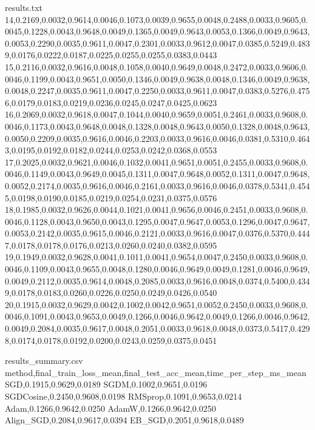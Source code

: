 \begin{filecontents*}{results.txt}
14,0.2169,0.0032,0.9614,0.0046,0.1073,0.0039,0.9655,0.0048,0.2488,0.0033,0.9605,0.0045,0.1228,0.0043,0.9648,0.0049,0.1365,0.0049,0.9643,0.0053,0.1366,0.0049,0.9643,0.0053,0.2290,0.0035,0.9611,0.0047,0.2301,0.0033,0.9612,0.0047,0.0385,0.5249,0.4839,0.0176,0.0222,0.0187,0.0225,0.0255,0.0255,0.0383,0.0443
15,0.2116,0.0032,0.9616,0.0048,0.1058,0.0040,0.9649,0.0048,0.2472,0.0033,0.9606,0.0046,0.1199,0.0043,0.9651,0.0050,0.1346,0.0049,0.9638,0.0048,0.1346,0.0049,0.9638,0.0048,0.2247,0.0035,0.9611,0.0047,0.2250,0.0033,0.9611,0.0047,0.0383,0.5276,0.4756,0.0179,0.0183,0.0219,0.0236,0.0245,0.0247,0.0425,0.0623
16,0.2069,0.0032,0.9618,0.0047,0.1044,0.0040,0.9659,0.0051,0.2461,0.0033,0.9608,0.0046,0.1173,0.0043,0.9648,0.0048,0.1328,0.0048,0.9643,0.0050,0.1328,0.0048,0.9643,0.0050,0.2209,0.0035,0.9616,0.0046,0.2203,0.0033,0.9616,0.0046,0.0381,0.5310,0.4643,0.0195,0.0192,0.0182,0.0244,0.0253,0.0242,0.0368,0.0553
17,0.2025,0.0032,0.9621,0.0046,0.1032,0.0041,0.9651,0.0051,0.2455,0.0033,0.9608,0.0046,0.1149,0.0043,0.9649,0.0045,0.1311,0.0047,0.9648,0.0052,0.1311,0.0047,0.9648,0.0052,0.2174,0.0035,0.9616,0.0046,0.2161,0.0033,0.9616,0.0046,0.0378,0.5341,0.4545,0.0198,0.0190,0.0185,0.0219,0.0254,0.0231,0.0375,0.0576
18,0.1985,0.0032,0.9626,0.0044,0.1021,0.0041,0.9656,0.0046,0.2451,0.0033,0.9608,0.0046,0.1128,0.0043,0.9650,0.0043,0.1295,0.0047,0.9647,0.0053,0.1296,0.0047,0.9647,0.0053,0.2142,0.0035,0.9615,0.0046,0.2121,0.0033,0.9616,0.0047,0.0376,0.5370,0.4447,0.0178,0.0178,0.0176,0.0213,0.0260,0.0240,0.0382,0.0595
19,0.1949,0.0032,0.9628,0.0041,0.1011,0.0041,0.9654,0.0047,0.2450,0.0033,0.9608,0.0046,0.1109,0.0043,0.9655,0.0048,0.1280,0.0046,0.9649,0.0049,0.1281,0.0046,0.9649,0.0049,0.2112,0.0035,0.9614,0.0048,0.2085,0.0033,0.9616,0.0048,0.0374,0.5400,0.4349,0.0178,0.0183,0.0260,0.0226,0.0250,0.0249,0.0426,0.0540
20,0.1915,0.0032,0.9629,0.0042,0.1002,0.0042,0.9651,0.0052,0.2450,0.0033,0.9608,0.0046,0.1091,0.0043,0.9653,0.0049,0.1266,0.0046,0.9642,0.0049,0.1266,0.0046,0.9642,0.0049,0.2084,0.0035,0.9617,0.0048,0.2051,0.0033,0.9618,0.0048,0.0373,0.5417,0.4298,0.0174,0.0178,0.0192,0.0200,0.0243,0.0259,0.0375,0.0451
\end{filecontents*}

\begin{filecontents*}{results_summary.csv}
method,final_train_loss_mean,final_test_acc_mean,time_per_step_ms_mean
SGD,0.1915,0.9629,0.0189
SGDM,0.1002,0.9651,0.0196
SGDCosine,0.2450,0.9608,0.0198
RMSprop,0.1091,0.9653,0.0214
Adam,0.1266,0.9642,0.0250
AdamW,0.1266,0.9642,0.0250
Align_SGD,0.2084,0.9617,0.0394
EB_SGD,0.2051,0.9618,0.0489
\end{filecontents*}

